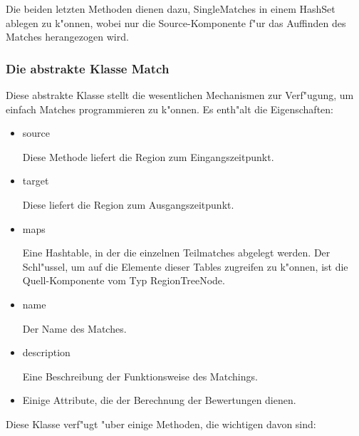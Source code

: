 Die beiden letzten Methoden dienen dazu, SingleMatches in einem HashSet ablegen zu k"onnen, wobei nur die Source-Komponente f"ur das Auffinden des Matches herangezogen wird.

\subsubsection{Die abstrakte Klasse Match}
Diese abstrakte Klasse stellt die wesentlichen Mechanismen zur Verf"ugung, um einfach Matches programmieren zu k"onnen. Es enth"alt die Eigenschaften:
\begin{itemize}
\item source

Diese Methode liefert die Region zum Eingangszeitpunkt.

\item target

Diese liefert die Region zum Ausgangszeitpunkt.

\item maps

Eine Hashtable, in der die einzelnen Teilmatches abgelegt werden. Der Schl"ussel, um auf die Elemente dieser Tables zugreifen zu k"onnen, ist die Quell-Komponente vom Typ RegionTreeNode.

\item name

Der Name des Matches.

\item description

Eine Beschreibung der Funktionsweise des Matchings.

\item Einige Attribute, die der Berechnung der Bewertungen dienen.
\end{itemize} 

Diese Klasse verf"ugt "uber einige Methoden, die wichtigen davon  sind:

